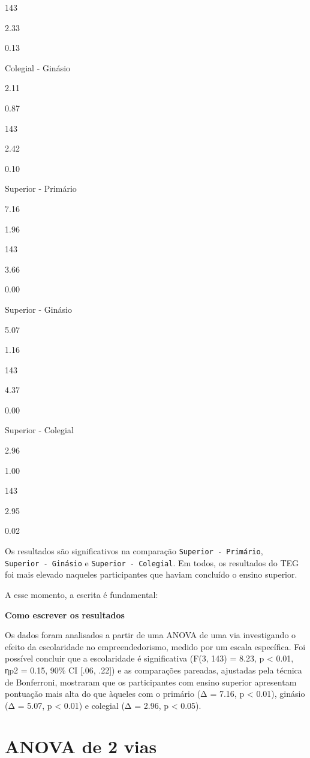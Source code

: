 \documentclass[
]{book}
\begin{document}
143

2.33

0.13

Colegial - Ginásio

2.11

0.87

143

2.42

0.10

Superior - Primário

7.16

1.96

143

3.66

0.00

Superior - Ginásio

5.07

1.16

143

4.37

0.00

Superior - Colegial

2.96

1.00

143

2.95

0.02

Os resultados são significativos na comparação \texttt{Superior\ -\ Primário}, \texttt{Superior\ -\ Ginásio} e \texttt{Superior\ -\ Colegial}. Em todos, os resultados do TEG foi mais elevado naqueles participantes que haviam concluído o ensino superior.

A esse momento, a escrita é fundamental:

\begin{writing}
\textbf{Como escrever os resultados}

Os dados foram analisados a partir de uma ANOVA de uma via investigando
o efeito da escolaridade no empreendedorismo, medido por um escala
específica. Foi possível concluir que a escolaridade é significativa
(F(3, 143) = 8.23, p \textless{} 0.01, ηp2 = 0.15, 90\% CI {[}.06,
.22{]}) e as comparações pareadas, ajustadas pela técnica de Bonferroni,
mostraram que os participantes com ensino superior apresentam pontuação
mais alta do que àqueles com o primário (Δ = 7.16, p \textless{} 0.01),
ginásio (Δ = 5.07, p \textless{} 0.01) e colegial (Δ = 2.96, p
\textless{} 0.05).
\end{writing}

\hypertarget{anova-de-2-vias}{%
\section{ANOVA de 2 vias}\label{anova-de-2-vias}}
\end{document}

